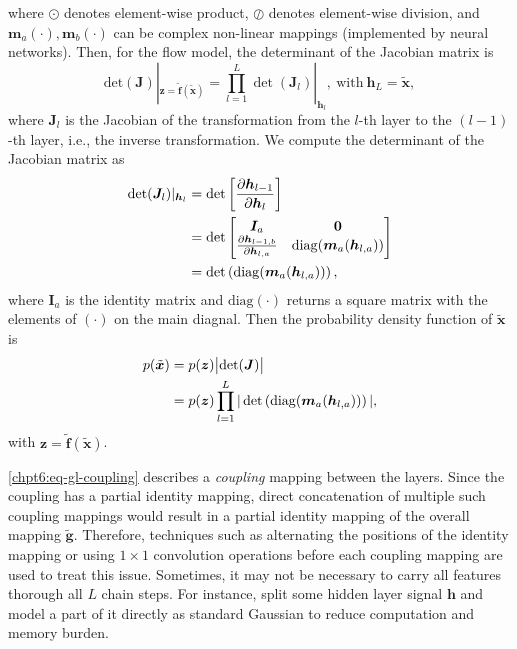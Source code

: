 where $\odot$ denotes element-wise product, $\oslash$ denotes
element-wise division, and $\bm{m}_a(\cdot), \bm{m}_b(\cdot)$ can be
complex non-linear mappings (implemented by neural networks).
Then, for the flow model, the determinant of the Jacobian matrix is
\begin{equation}
  \mathrm{det}(\bm{J}) |_{\bm{z}=\tilde{\bm{f}}(\tilde{\bm{x}})} = \prod_{l=1}^L \det (\bm{J}_l) |_{\bm{h}_{l}}, ~\mathrm{with}~ \bm{h}_L = \tilde{\bm{x}},
\end{equation}
where $\bm{J}_l$ is the Jacobian of the transformation from the $l$-th layer to the $(l-1)$-th layer, i.e., the inverse transformation. We compute the determinant of the Jacobian matrix as
\begin{align}\label{eq-hl-determinate}
  \det (\bm{J}_l)|_{\bm{h}_{l}}& = \det \left[  \frac{ \partial \bm{h}_{l-1}}{\partial \bm{h}_l} \right] \nonumber\\
                               & = \det
                                 \begin{bmatrix}
                                   \bm{I}_a & \mathbf{0} \nonumber\\
                                   \frac{ \partial \bm{h}_{l-1,b}}{\partial \bm{h}_{l,a}} & \mathrm{diag}(\bm{m}_a(\bm{h}_{l,a}))
                                 \end{bmatrix}\nonumber\\
                               &= \det \left( \mathrm{diag}(\bm{m}_a(\bm{h}_{l,a})) \right),
\end{align}
where $\bm{I}_a$ is the identity matrix and $\mathrm{diag}(\cdot)$ returns a square matrix with the elements of $(\cdot)$ on the main diagnal. Then the probability density function of $\tilde{\bm{x}}$ is
\begin{align}
  p(\tilde{\bm{x}}) & =  p(\bm{z}) \big| \mathrm{det}(\bm{J}) \big| \nonumber\\
                    &  = p(\bm{z}) \prod_{l=1}^L | \det\left( \mathrm{diag}(\bm{m}_a(\bm{h}_{l,a}))  \right) |,
\end{align}
with $\bm{z}=\tilde{\bm{f}}(\tilde{\bm{x}})$.

\eqref{chpt6:eq-gl-coupling} describes a \textit{coupling} mapping between the layers. Since the coupling has a partial identity mapping, direct concatenation of multiple such coupling mappings would result in a partial identity mapping of the overall mapping $\tilde{\bm{g}}$. Therefore, techniques such as alternating the positions of the identity mapping \cite{2016arXiv160508803D} or using $1\times1$ convolution operations before each coupling mapping \cite{2018arXiv180703039K} are used to treat this issue.
Sometimes, it may not be necessary to carry all features thorough all $L$ chain steps. For instance, \cite{2016arXiv160508803D}\cite{2018arXiv180703039K} split some hidden
layer signal $\bm{h}$ and model a part of it directly as standard Gaussian to reduce computation and memory burden.


